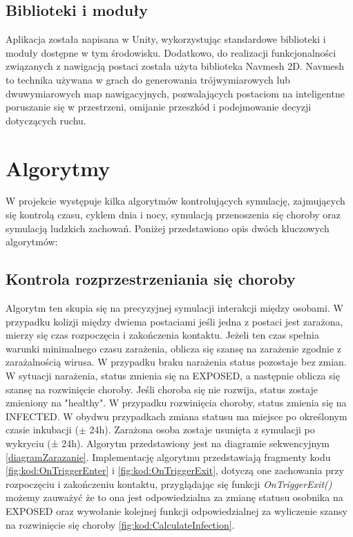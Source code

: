 \subsection{Biblioteki i moduły}
Aplikacja została napisana w Unity, wykorzystując standardowe biblioteki i moduły dostępne w tym środowisku. Dodatkowo, do realizacji funkcjonalności związanych z nawigacją postaci została użyta biblioteka Navmesh 2D. Navmesh to technika używana w grach do generowania trójwymiarowych lub dwuwymiarowych map nawigacyjnych, pozwalających postaciom na inteligentne poruszanie się w przestrzeni, omijanie przeszkód i podejmowanie decyzji dotyczących ruchu.

\section{\textbf{Algorytmy}}

W projekcie występuje kilka algorytmów kontrolujących symulację, zajmujących się kontrolą czasu, cyklem dnia i nocy, symulacją przenoszenia się choroby oraz symulacją ludzkich zachowań. Poniżej przedstawiono opis dwóch kluczowych algorytmów:
\subsection{Kontrola rozprzestrzeniania się choroby}
Algorytm ten skupia się na precyzyjnej symulacji interakcji między osobami. W przypadku kolizji między dwiema postaciami jeśli jedna z postaci jest zarażona, mierzy się czas rozpoczęcia i zakończenia kontaktu. Jeżeli ten czas spełnia warunki minimalnego czasu zarażenia, oblicza się szansę na zarażenie zgodnie z zarażalnością wirusa. W przypadku braku narażenia status pozostaje bez zmian. W sytuacji narażenia, status zmienia się na EXPOSED, a następnie oblicza się szansę na rozwinięcie choroby. Jeśli choroba się nie rozwija, status zostaje zmieniony na "healthy". W przypadku rozwinięcia choroby, status zmienia się na INFECTED. W obydwu przypadkach zmiana statusu ma miejsce po określonym czasie inkubacji ($\pm$ 24h). Zarażona osoba zostaje usunięta z symulacji po wykryciu (± 24h). Algorytm przedstawiony jest na diagramie sekwencyjnym \ref{diagramZarazanie}. Implementację algorytmu przedstawiają fragmenty kodu \ref{fig:kod:OnTriggerEnter} i \ref{fig:kod:OnTriggerExit}, dotyczą one zachowania przy rozpoczęciu i zakończeniu kontaktu, przyglądając się funkcji \textit{OnTriggerExit()} możemy zauważyć że to ona jest odpowiedzialna za zmianę statusu osobnika na EXPOSED oraz wywołanie kolejnej funkcji odpowiedzialnej za wyliczenie szansy na rozwinięcie się choroby \ref{fig:kod:CalculateInfection}.


